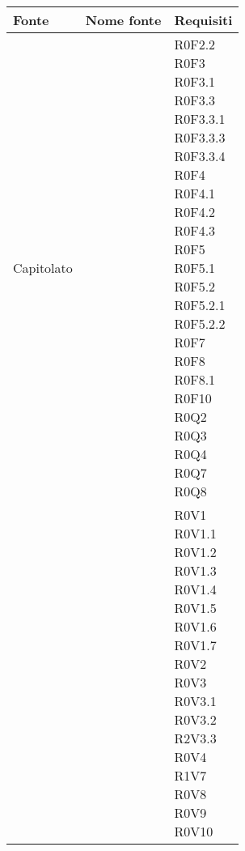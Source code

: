 \documentclass[AnalisiDeiRequisiti.tex]{subfiles}
\begin{document}
\label{table:Tabella di tracciamento fonti-requisiti}


\renewcommand*{\arraystretch}{1.2}
\begin{longtable}[H]{p{2cm}p{5cm}p{5cm}}
	\rowcolor{CHeader} 
	\color{CHeaderText} \textbf{Fonte} & \color{CHeaderText} \textbf{Nome fonte} & \color{CHeaderText} \textbf{Requisiti} \\  
	\endhead
	\rowcolor{CRighePari}
	Capitolato & & \makecell[tl]{ R0F2.2 \\
	 R0F3 \\
	 R0F3.1 \\
	 R0F3.3 \\
	 R0F3.3.1 \\
	 R0F3.3.3 \\
	 R0F3.3.4 \\
	 R0F4 \\
	 R0F4.1 \\
	 R0F4.2 \\
	 R0F4.3 \\
	 R0F5 \\
	 R0F5.1 \\
	 R0F5.2 \\
	 R0F5.2.1 \\
	 R0F5.2.2 \\
	 R0F7 \\
	 R0F8 \\
	 R0F8.1 \\
	 R0F10 \\
	 R0Q2 \\
	 R0Q3 \\
	 R0Q4 \\
	 R0Q7 \\
	 R0Q8 } \\
	 & & \makecell[tl]{ R0V1 \\
	 R0V1.1 \\
	 R0V1.2 \\
	 R0V1.3 \\
	 R0V1.4 \\
	 R0V1.5 \\
	 R0V1.6 \\
	 R0V1.7 \\
	 R0V2 \\
	 R0V3 \\
	 R0V3.1 \\
	 R0V3.2 \\
	 R2V3.3 \\
	 R0V4 \\
	 R1V7 \\
	 R0V8 \\
	 R0V9 \\
	 R0V10 } \\
	

\end{longtable}
\end{document}
